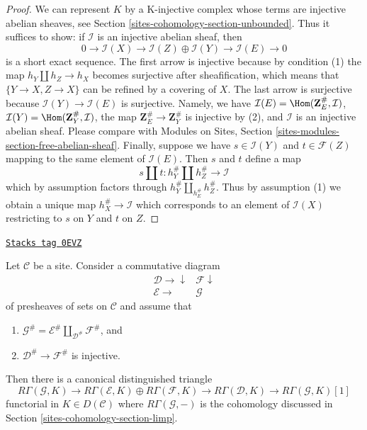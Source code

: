 \begin{proof}
We can represent $K$ by a K-injective complex whose terms are injective
abelian sheaves, see Section \ref{sites-cohomology-section-unbounded}.
Thus it suffices to show: if $\mathcal{I}$ is an injective abelian
sheaf, then
$$
0 \to \mathcal{I}(X) \to
\mathcal{I}(Z) \oplus \mathcal{I}(Y) \to
\mathcal{I}(E) \to 0
$$
is a short exact sequence. The first arrow is injective
because by condition (1) the map $h_Y \amalg h_Z \to h_X$
becomes surjective after sheafification, which means that
$\{Y \to X, Z \to X\}$ can be refined by a covering of $X$.
The last arrow is surjective because $\mathcal{I}(Y) \to \mathcal{I}(E)$
is surjective. Namely, we have
$\mathcal{I}(E) = \Hom(\mathbf{Z}_E^\#, \mathcal{I})$,
$\mathcal{I}(Y) = \Hom(\mathbf{Z}_Y^\#, \mathcal{I})$,
the map $\mathbf{Z}_E^\# \to \mathbf{Z}_Y^\#$ is injective
by (2), and $\mathcal{I}$ is an injective abelian sheaf.
Please compare with Modules on Sites, Section
\ref{sites-modules-section-free-abelian-sheaf}.
Finally, suppose we have $s \in \mathcal{I}(Y)$ and
$t \in \mathcal{F}(Z)$ mapping to the same element of
$\mathcal{I}(E)$. Then $s$ and $t$ define a map
$$
s \amalg t : h_Y^\# \amalg h_Z^\# \longrightarrow \mathcal{I}
$$
which by assumption factors through $h_Y^\# \amalg_{h_E^\#} h_Z^\#$.
Thus by assumption (1) we obtain a unique map
$h_X^\# \to \mathcal{I}$ which corresponds to an element
of $\mathcal{I}(X)$ restricting to $s$ on $Y$ and $t$ on $Z$.
\end{proof}

\begin{lemma}
\label{sites-cohomology-lemma-square-triangle-general}
\href{https://stacks.math.columbia.edu/tag/0EVZ}{\texttt{Stacks tag 0EVZ}}

Let $\mathcal{C}$ be a site. Consider a commutative diagram
$$
\begin{array}{cc}\mathcal{D} \longrightarrow\downarrow & \mathcal{F} \downarrow \\ \mathcal{E} \longrightarrow & \mathcal{G}\end{array}
$$
of presheaves of sets on $\mathcal{C}$ and assume that
\begin{enumerate}
\item $\mathcal{G}^\# =
\mathcal{E}^\# \amalg_{\mathcal{D}^\#} \mathcal{F}^\#$, and
\item $\mathcal{D}^\# \to \mathcal{F}^\#$ is injective.
\end{enumerate}
Then there is a canonical distinguished triangle
$$
R\Gamma(\mathcal{G}, K) \to
R\Gamma(\mathcal{E}, K) \oplus
R\Gamma(\mathcal{F}, K) \to
R\Gamma(\mathcal{D}, K) \to
R\Gamma(\mathcal{G}, K)[1]
$$
functorial in $K \in D(\mathcal{C})$ where $R\Gamma(\mathcal{G}, -)$
is the cohomology discussed in Section \ref{sites-cohomology-section-limp}.
\end{lemma}

